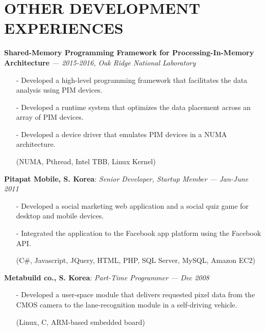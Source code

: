 \section{OTHER DEVELOPMENT EXPERIENCES} 
\vspace{0.03in}

  {\bf Shared-Memory Programming Framework for Processing-In-Memory Architecture}
   {\it \footnotesize --- 2015-2016, Oak Ridge National Laboratory}
   \begin{itemize}[leftmargin=*]
    \setlength\itemsep{-0.02in}
    \item[-] Developed a high-level programming framework that
             facilitates the data analysis using PIM devices.
    \item[-] Developed a runtime system that optimizes the data placement across an array of
             PIM devices.
    \item[-] Developed a device driver that emulates PIM devices in a NUMA architecture.
    \item[] {\small(NUMA, Pthread, Intel TBB, Linux Kernel)}
   \end{itemize}

  \vspace{-0.15in}
  {\bf Pitapat Mobile, S. Korea}: \emph{Senior Developer, Startup Member}
    {\it \footnotesize --- Jan-June 2011}
    \begin{itemize}[leftmargin=*]
    \setlength\itemsep{-0.02in}
     \item[-] Developed a social marketing web application and a social quiz game for 
              desktop and mobile devices.
     \item[-] Integrated the application to the Facebook app platform using the Facebook API.
     \item[]  {\small(C\#, Javascript, JQuery, HTML, PHP, SQL Server, MySQL, Amazon EC2)}
\end{itemize}

  \vspace{-0.15in}
  {\bf Metabuild co., S. Korea}: \emph{Part-Time Programmer}
    {\it \footnotesize --- Dec 2008}
    \begin{itemize}[leftmargin=*]
    \setlength\itemsep{-0.02in}
     \item[-] Developed a user-space module that delivers requested pixel data from the CMOS camera
              to the lane-recognition module in a self-driving vehicle.
     \item[] {\small(Linux, C, ARM-based embedded board)}
\end{itemize}

